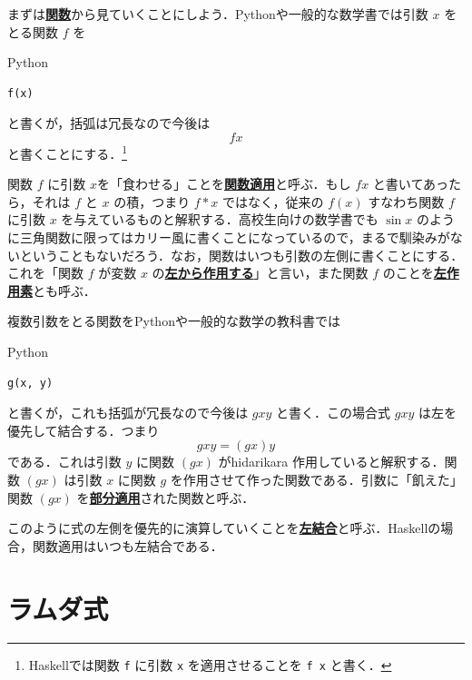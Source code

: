 \documentclass[a4paper,twocolumn]{jsbook}
\newcommand{\programminglanguage}[1]{\textsf{#1}}
\newcommand{\haskell}{\programminglanguage{Haskell}}
\newcommand{\python}{\programminglanguage{Python}}
\newcommand{\keyword}[1]{{\underline{\textbf{#1}}}}
\newcommand{\code}[1]{\texttt{#1}}
\newenvironment{pythoncode}{\begin{itembox}[r]{\python}}{\end{itembox}}
\begin{document}
まずは\keyword{関数}から見ていくことにしよう．\python や一般的な数学書では引数 $x$ をとる関数 $f$ を
\begin{pythoncode}
\begin{verbatim}
f(x)
\end{verbatim}
\end{pythoncode}
と書くが，括弧は冗長なので今後は
\begin{equation}
fx
\end{equation}
と書くことにする．\footnote{\haskell では関数 \code{f} に引数 \code{x} を適用させることを  \code{f x} と書く．}


関数 $f$ に引数 $x$を「食わせる」ことを\keyword{関数適用}と呼ぶ．もし $fx$ と書いてあったら，それは $f$ と $x$ の積，つまり $f*x$ ではなく，従来の $f(x)$ すなわち関数 $f$ に引数 $x$ を与えているものと解釈する．高校生向けの数学書でも $\sin x$ のように三角関数に限ってはカリー風に書くことになっているので，まるで馴染みがないということもないだろう．なお，関数はいつも引数の左側に書くことにする．これを「関数 $f$ が変数 $x$ の\keyword{左から作用する}」と言い，また関数 $f$ のことを\keyword{左作用素}とも呼ぶ．

複数引数をとる関数を\python や一般的な数学の教科書では
\begin{pythoncode}
\begin{verbatim}
g(x, y)
\end{verbatim}
\end{pythoncode}
と書くが，これも括弧が冗長なので今後は $gxy$ と書く．この場合式 $gxy$ は左を優先して結合する．つまり
\begin{equation}
gxy=(gx)y
\end{equation}
である．これは引数 $y$ に関数 $(gx)$ がhidarikara 
作用していると解釈する．関数 $(gx)$ は引数 $x$ に関数 $g$ を作用させて作った関数である．引数に「飢えた」関数 $(gx)$ を\keyword{部分適用}された関数と呼ぶ．

このように式の左側を優先的に演算していくことを\keyword{左結合}と呼ぶ．\haskell の場合，関数適用はいつも左結合である．

\section{ラムダ式}
\end{document}
